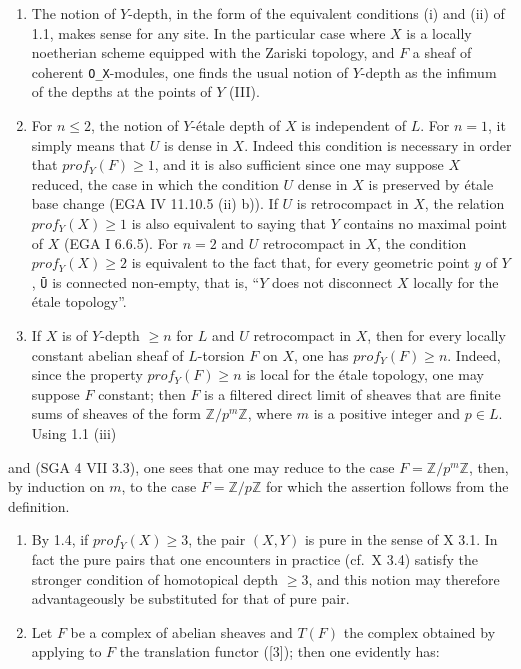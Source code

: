 \documentclass[
]{article}
\begin{document}
\begin{enumerate}
\def\labelenumi{\alph{enumi})}
\item
  The notion of \(Y\)-depth, in the form of the equivalent conditions
  (i) and (ii) of 1.1, makes sense for any site. In the particular case
  where \(X\) is a locally noetherian scheme equipped with the Zariski
  topology, and \(F\) a sheaf of coherent \texttt{O\_X}-modules, one
  finds the usual notion of \(Y\)-depth as the infimum of the depths at
  the points of \(Y\) (III).
\item
  For \(n \leqslant 2\), the notion of \(Y\)-étale depth of \(X\) is
  independent of \(L\). For \(n = 1\), it simply means that \(U\) is
  dense in \(X\). Indeed this condition is necessary in order that
  \(prof_{Y}(F) \geqslant 1\), and it is also sufficient since one may
  suppose \(X\) reduced, the case in which the condition \(U\) dense in
  \(X\) is preserved by étale base change (EGA IV 11.10.5 (ii) b)). If
  \(U\) is retrocompact in \(X\), the relation
  \(prof_{Y}(X) \geqslant 1\) is also equivalent to saying that \(Y\)
  contains no maximal point of \(X\) (EGA I 6.6.5). For \(n = 2\) and
  \(U\) retrocompact in \(X\), the condition \(prof_{Y}(X) \geqslant 2\)
  is equivalent to the fact that, for every geometric point \(y\) of
  \(Y\), \texttt{Ū} is connected non-empty, that is, ``\(Y\) does not
  disconnect \(X\) locally for the étale topology''.
\item
  If \(X\) is of \(Y\)-depth \(\geqslant n\) for \(L\) and \(U\)
  retrocompact in \(X\), then for every locally constant abelian sheaf
  of \(L\)-torsion \(F\) on \(X\), one has \(prof_{Y}(F) \geqslant n\).
  Indeed, since the property \(prof_{Y}(F) \geqslant n\) is local for
  the étale topology, one may suppose \(F\) constant; then \(F\) is a
  filtered direct limit of sheaves that are finite sums of sheaves of
  the form \(\mathbb{Z}/p^{m} \mathbb{Z}\), where \(m\) is a positive
  integer and \(p \in L\). Using 1.1 (iii)
\end{enumerate}

and (SGA 4 VII 3.3), one sees that one may reduce to the case
\(F = \mathbb{Z}/p^{m} \mathbb{Z}\), then, by induction on \(m\), to the
case \(F = \mathbb{Z}/p\mathbb{Z}\) for which the assertion follows from
the definition.

\begin{enumerate}
\def\labelenumi{\alph{enumi})}
\setcounter{enumi}{3}
\item
  By 1.4, if \(prof_{Y}(X) \geqslant 3\), the pair \((X, Y)\) is pure in
  the sense of X 3.1. In fact the pure pairs that one encounters in
  practice (cf.~X 3.4) satisfy the stronger condition of homotopical
  depth \(\geqslant 3\), and this notion may therefore advantageously be
  substituted for that of pure pair.
\item
  Let \(F\) be a complex of abelian sheaves and \(T(F)\) the complex
  obtained by applying to \(F\) the translation functor ({[}3{]}); then
  one evidently has:
\end{enumerate}
\end{document}
